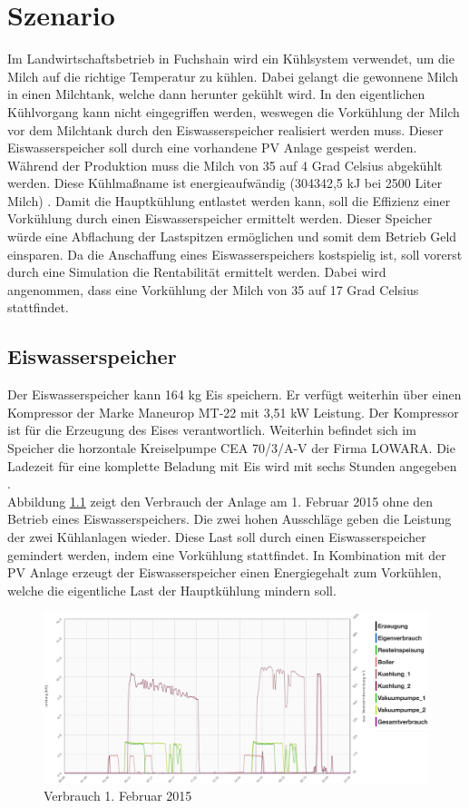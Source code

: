 \chapter{Szenario}
Im Landwirtschaftsbetrieb in Fuchshain wird ein Kühlsystem verwendet, um die Milch auf die richtige Temperatur zu kühlen. Dabei gelangt die gewonnene Milch in einen Milchtank, welche dann herunter gekühlt wird. In den eigentlichen Kühlvorgang kann nicht eingegriffen werden, weswegen die Vorkühlung der Milch vor dem Milchtank durch den Eiswasserspeicher realisiert werden muss. Dieser Eiswasserspeicher soll durch eine vorhandene PV Anlage gespeist werden.\\
Während der Produktion muss die Milch von 35 auf 4 Grad Celsius abgekühlt werden. Diese Kühlmaßname ist energieaufwändig (304342,5 kJ bei 2500 Liter Milch) \cite{kusow}. Damit die Hauptkühlung entlastet werden kann, soll die Effizienz einer Vorkühlung durch einen Eiswasserspeicher ermittelt werden. Dieser Speicher würde eine Abflachung der Lastspitzen ermöglichen und somit dem Betrieb Geld einsparen. Da die Anschaffung eines Eiswasserspeichers kostspielig ist, soll vorerst durch eine Simulation die Rentabilität ermittelt werden. Dabei wird angenommen, dass eine Vorkühlung der Milch von 35 auf 17 Grad Celsius stattfindet.

\section{Eiswasserspeicher}
Der Eiswasserspeicher kann 164 kg Eis speichern. Er verfügt weiterhin über einen Kompressor der Marke Maneurop MT-22 mit 3,51 kW Leistung. Der Kompressor ist für die Erzeugung des Eises verantwortlich. Weiterhin befindet sich im Speicher die horzontale Kreiselpumpe CEA 70/3/A-V der Firma LOWARA. Die Ladezeit für eine komplette Beladung mit Eis wird mit sechs Stunden angegeben \cite{kusow}.\\
Abbildung \ref{verbrauch1feb} zeigt den Verbrauch der Anlage am 1. Februar 2015 ohne den Betrieb eines Eiswasserspeichers. Die zwei hohen Ausschläge geben die Leistung der zwei Kühlanlagen wieder. Diese Last soll durch einen Eiswasserspeicher gemindert werden, indem eine Vorkühlung stattfindet. In Kombination mit der PV Anlage erzeugt der Eiswasserspeicher einen Energiegehalt zum Vorkühlen, welche die eigentliche Last der Hauptkühlung mindern soll.
 \begin{figure}[H]
 	\centering
 	\includegraphics[width=\textwidth]{bilder/verbrauch1feb.png}
 	\caption{Verbrauch 1. Februar 2015}
 	\label{verbrauch1feb}
 \end{figure}

